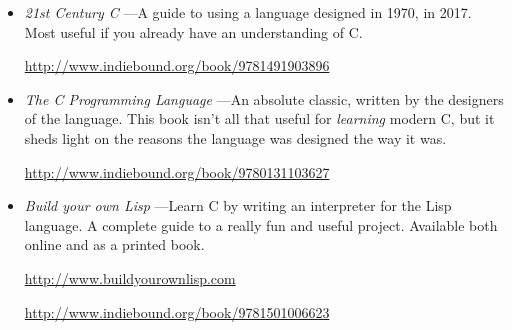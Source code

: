 \documentclass[12pt,twoside]{reedthesis}
\begin{document}
\begin{appendices}
\begin{itemize}
            \item \emph{21st Century C}
            ---A guide to using a language designed in 1970, in 2017. Most useful if you already have an understanding of C.

            \url{http://www.indiebound.org/book/9781491903896}

            \item \emph{The C Programming Language}
            ---An absolute classic, written by the designers of the language. This book isn't all that useful for \emph{learning} modern C, but it sheds light on the reasons the language was designed the way it was.

            \url{http://www.indiebound.org/book/9780131103627}

            \item \emph{Build your own Lisp}
            ---Learn C by writing an interpreter for the Lisp language. A complete guide to a really fun and useful project. Available both online and as a printed book.

            \url{http://www.buildyourownlisp.com}

            \url{http://www.indiebound.org/book/9781501006623}
        \end{itemize}
\end{appendices}



  \backmatter %

    \nocite{*}


%  
 

\end{document}
